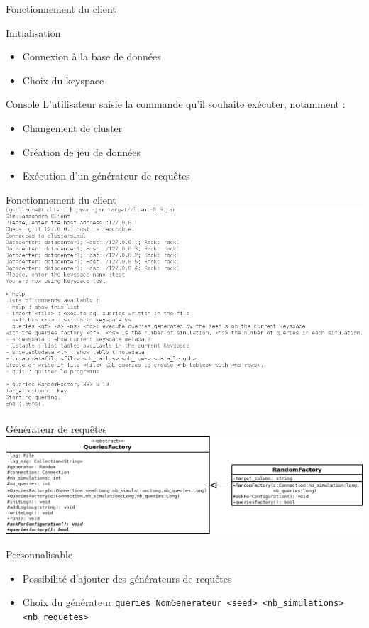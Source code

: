 \documentclass{beamer}
\begin{document}
\begin{frame}{Fonctionnement du client}
  \begin{block}{Initialisation}
    \begin{itemize}
    \item Connexion à la base de données
    \item Choix du keyspace
    \end{itemize}
  \end{block}

  \begin{block}{Console}
  L'utilisateur saisie la commande qu'il souhaite exécuter, notamment :
    \begin{itemize}
    \item Changement de cluster
    \item Création de jeu de données
    \item Exécution d'un générateur de requêtes
    \end{itemize}
  \end{block}
\end{frame}

\begin{frame}{Fonctionnement du client}
\centering
    \includegraphics[scale=0.40]{captureclient}
\end{frame}

\begin{frame}{Générateur de requêtes}
\centering
    \includegraphics[scale=0.3]{architecture_req}


  \begin{block}{Personnalisable}
   \begin{itemize}
    \item Possibilité d'ajouter des générateurs de requêtes
    \item Choix du générateur \newline \texttt{queries NomGenerateur <seed> <nb\_simulations> <nb\_requetes>}
   \end{itemize}
  \end{block}
\end{frame}
\end{document}
